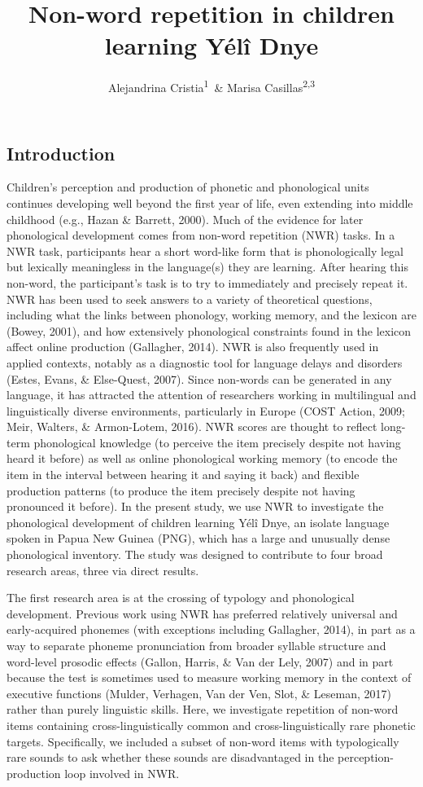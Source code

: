 \documentclass[english,,man,floatsintext]{apa6}
\author{Alejandrina Cristia\textsuperscript{1}\ \& Marisa Casillas\textsuperscript{2,3}}
\affiliation{
\vspace{0.5cm}
\textsuperscript{1} Laboratoire de Sciences Cognitives et de Psycholinguistique, Département d'Etudes Cognitives, ENS, EHESS, CNRS, PSL University\\\textsuperscript{2} Max Planck Institute for Psycholinguistics\\\textsuperscript{3} University of Chicago}
\title{Non-word repetition in children learning Yélî Dnye}
\date{}
\begin{document}
\maketitle

\hypertarget{introduction}{%
\subsection{Introduction}\label{introduction}}

Children's perception and production of phonetic and phonological units continues developing well beyond the first year of life, even extending into middle childhood (e.g., Hazan \& Barrett, 2000). Much of the evidence for later phonological development comes from non-word repetition (NWR) tasks. In a NWR task, participants hear a short word-like form that is phonologically legal but lexically meaningless in the language(s) they are learning. After hearing this non-word, the participant's task is to try to immediately and precisely repeat it. NWR has been used to seek answers to a variety of theoretical questions, including what the links between phonology, working memory, and the lexicon are (Bowey, 2001), and how extensively phonological constraints found in the lexicon affect online production (Gallagher, 2014). NWR is also frequently used in applied contexts, notably as a diagnostic tool for language delays and disorders (Estes, Evans, \& Else-Quest, 2007). Since non-words can be generated in any language, it has attracted the attention of researchers working in multilingual and linguistically diverse environments, particularly in Europe (COST Action, 2009; Meir, Walters, \& Armon-Lotem, 2016). NWR scores are thought to reflect long-term phonological knowledge (to perceive the item precisely despite not having heard it before) as well as online phonological working memory (to encode the item in the interval between hearing it and saying it back) and flexible production patterns (to produce the item precisely despite not having pronounced it before). In the present study, we use NWR to investigate the phonological development of children learning Yélî Dnye, an isolate language spoken in Papua New Guinea (PNG), which has a large and unusually dense phonological inventory. The study was designed to contribute to four broad research areas, three via direct results.

The first research area is at the crossing of typology and phonological development. Previous work using NWR has preferred relatively universal and early-acquired phonemes (with exceptions including Gallagher, 2014), in part as a way to separate phoneme pronunciation from broader syllable structure and word-level prosodic effects (Gallon, Harris, \& Van der Lely, 2007) and in part because the test is sometimes used to measure working memory in the context of executive functions (Mulder, Verhagen, Van der Ven, Slot, \& Leseman, 2017) rather than purely linguistic skills. Here, we investigate repetition of non-word items containing cross-linguistically common and cross-linguistically rare phonetic targets. Specifically, we included a subset of non-word items with typologically rare sounds to ask whether these sounds are disadvantaged in the perception-production loop involved in NWR.
\end{document}
